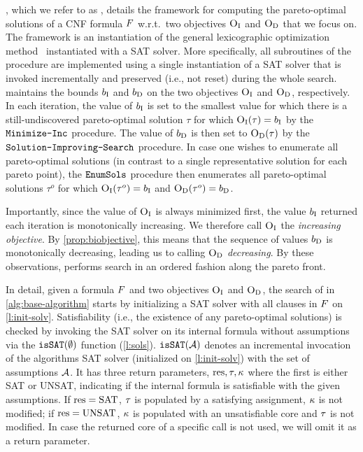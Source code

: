 , which we refer to as \algname{}, details the  framework for computing the pareto-optimal solutions of a CNF formula $F$ w.r.t.\ two objectives $\textsc{O}_{\text{I}}$ and $\textsc{O}_{\text{D}}$ that we focus on.
The framework is an instantiation of the general lexicographic optimization method~\autocite{survey} instantiated with a SAT solver.
More specifically, all subroutines of the procedure are implemented using a single instantiation of a SAT solver that is invoked incrementally and preserved (i.e., not reset) during the whole search. 
\algname{} maintains the bounds $b_{\text{I}}$ and $b_{\text{D}}$ on the two objectives $\textsc{O}_{\text{I}}$ and $\textsc{O}_{\text{D}}$, respectively.
In each iteration, the value of $b_{\text{I}}$ is set to the smallest value for which there is a still-undiscovered pareto-optimal solution $\tau$ for which $\textsc{O}_{\text{I}}(\tau) = b_{\text{I}}$ by the $\texttt{Minimize-\allowbreak{}Inc}$ procedure.
The value of $b_{\text{D}}$ is then set to $\textsc{O}_{\text{D}}(\tau)$ by the $\texttt{Solution-\allowbreak{}Improving-\allowbreak{}Search}$ procedure.
In case one wishes to enumerate all pareto-optimal solutions (in contrast to a single representative solution for each pareto point), the $\texttt{EnumSols}$ procedure then enumerates all pareto-optimal solutions $\tau^o$ for which $\textsc{O}_{\text{I}}(\tau^o) = b_{\text{I}}$ and $\textsc{O}_{\text{D}}(\tau^o) = b_{\text{D}}$.

Importantly, since the value of $\textsc{O}_{\text{I}}$ is always minimized first, the value $b_{\text{I}}$ returned each iteration is monotonically increasing. 
We therefore call $\textsc{O}_{\text{I}}$ the \emph{increasing objective}.
By \cref{prop:biobjective}, this means that the sequence of values $b_{\text{D}}$ is monotonically decreasing, leading us to calling $\textsc{O}_{\text{D}}$ \emph{decreasing}.
By these observations, \algname{} performs search in an ordered fashion along the pareto front.

In detail, given a formula $F$ and two objectives $\textsc{O}_{\text{I}}$ and $\textsc{O}_{\text{D}}$, the search of \algname{} in \cref{alg:base-algorithm} starts by initializing a SAT solver with all clauses in $F$ on \cref{l:init-solv}.
Satisfiability (i.e., the existence of any pareto-optimal solutions) is checked by invoking the SAT solver on its internal formula without assumptions via the $\texttt{isSAT}(\emptyset)$ function (\cref{l:sols}).
$\texttt{isSAT}(\mathcal{A})$ denotes an incremental invocation of the algorithms SAT solver (initialized on \cref{l:init-solv}) with the set of assumptions $\mathcal{A}$.
It has three return parameters, $\text{res},\tau,\kappa$ where the first is either SAT or UNSAT, indicating if the internal formula is satisfiable with the given assumptions.
If $\text{res}=\text{SAT}$, $\tau$ is populated by a satisfying assignment, $\kappa$ is not modified;
if $\text{res}=\text{UNSAT}$, $\kappa$ is populated with an unsatisfiable core and $\tau$ is not modified.
In case the returned core of a specific call is not used, we will omit it as a return parameter.

